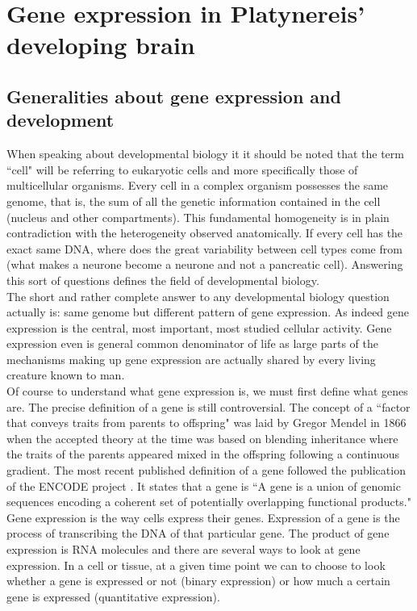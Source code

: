 \section{Gene expression in Platynereis' developing brain}
     \subsection{Generalities about gene expression and development}  
     When speaking about developmental biology it it should be noted that the term ``cell" will be referring to eukaryotic cells and more specifically those of multicellular organisms. Every cell in a complex organism possesses the same genome, that is, the sum of all the genetic information contained in the cell (nucleus and other compartments). This fundamental homogeneity is in plain contradiction with the heterogeneity observed anatomically. If every cell has the exact same DNA, where does the great variability between cell types come from (what makes a neurone become a neurone and not a pancreatic cell). Answering this sort of questions defines the field of developmental biology.\\
     
     The short and rather complete answer to any developmental biology question actually is: same genome but different pattern of gene expression. As indeed gene expression is the central, most important, most studied cellular activity. Gene expression even is general common denominator of life as large parts of the mechanisms making up gene expression are actually shared by every living creature known to man.\\

     Of course to understand what gene expression is, we must first define what genes are. The precise definition of a gene is still controversial. The concept of a ``factor that conveys traits from parents to offspring" was laid by Gregor Mendel in 1866 \cite{mendel66} when the accepted theory at the time was based on blending inheritance where the traits of the parents appeared mixed in the offspring following a continuous gradient. The most recent published definition of a gene followed the publication of the ENCODE project \cite{feingold04}. It states that a gene is ``A gene is a union of genomic sequences encoding a coherent set of potentially overlapping functional products."\\

	Gene expression is the way cells express their genes. Expression of a gene is the process of transcribing the DNA of that particular gene. The product of gene expression is RNA molecules and there are several ways to look at gene expression. In a cell or tissue, at a given time point we can to choose to look whether a gene is expressed or not (binary expression) or how much a certain gene is expressed (quantitative expression).\\
	
